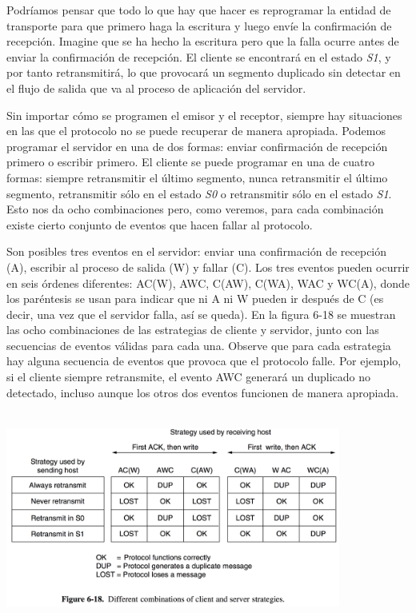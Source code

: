 \documentclass[10pt,a4paper]{report}
\begin{document}
	\par Podríamos pensar que todo lo que hay que hacer es reprogramar la entidad de transporte para que primero haga la escritura y luego envíe la confirmación de recepción. Imagine que se ha hecho la escritura pero que la falla ocurre antes de enviar la confirmación de recepción. El cliente se encontrará en el estado \textit{S1}, y por tanto retransmitirá, lo que provocará un segmento duplicado sin detectar en el flujo de salida que va al proceso de aplicación del servidor.

	\par Sin importar cómo se programen el emisor y el receptor, siempre hay situaciones en las que el protocolo no se puede recuperar de manera apropiada. Podemos programar el servidor en una de dos formas: enviar confirmación de recepción primero o escribir primero. El cliente se puede programar en una de cuatro formas: siempre retransmitir el último segmento, nunca retransmitir el último segmento, retransmitir sólo en el estado \textit{S0} o retransmitir sólo en el estado \textit{S1}. Esto nos da ocho combinaciones pero, como veremos, para cada combinación existe cierto conjunto de eventos que hacen fallar al protocolo.

	\par Son posibles tres eventos en el servidor: enviar una confirmación de recepción (A), escribir al proceso de salida (W) y fallar (C). Los tres eventos pueden ocurrir en seis órdenes diferentes: AC(W), AWC, C(AW), C(WA), WAC y WC(A), donde los paréntesis se usan para indicar que ni A ni W pueden ir después de C (es decir, una vez que el servidor falla, así se queda). En la figura 6-18 se muestran las ocho combinaciones de las estrategias de cliente y servidor, junto con las secuencias de eventos válidas para cada una. Observe que para cada estrategia hay alguna secuencia de eventos que provoca que el protocolo falle. Por ejemplo, si el cliente siempre retransmite, el evento AWC generará un duplicado no detectado, incluso aunque los otros dos eventos funcionen de manera apropiada.
	
	\begin{center}
		\includegraphics[width=11cm, height=7cm]{./imagenes/fallas.png} 
	\end{center}
\end{document}
